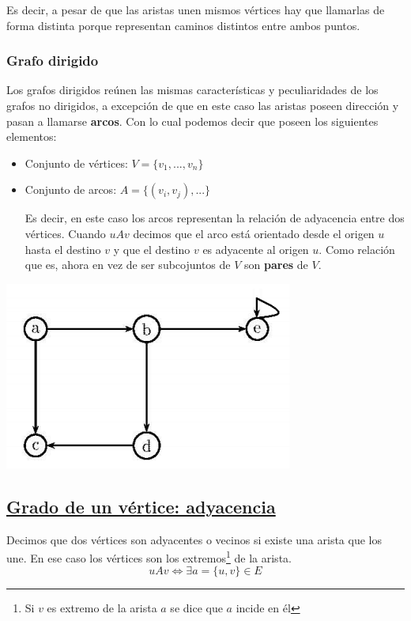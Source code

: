 \documentclass[10pt,a4paper,openright]{book}
\begin{document}
Es decir, a pesar de que las aristas unen mismos vértices hay que llamarlas de forma distinta porque representan caminos distintos entre ambos puntos.

\subsubsection*{Grafo dirigido}
Los grafos dirigidos reúnen las mismas características y peculiaridades de los grafos no dirigidos, a excepción de que en este caso las aristas poseen dirección y pasan a llamarse \textbf{arcos}. Con lo cual podemos decir que poseen los siguientes elementos:
\begin{itemize}
\item Conjunto de vértices: $V=\{v_1, ..., v_n\}$

\item Conjunto de arcos: $A=\{(v_i,v_j), ...\}$

	Es decir, en este caso los arcos representan la relación de adyacencia entre dos vértices. Cuando $uAv$ decimos que el arco está orientado desde el origen $u$ hasta el destino $v$ y que el destino $v$ es adyacente al origen $u$. Como relación que es, ahora en vez de ser subcojuntos de $V$ son \textbf{pares} de $V$.
\end{itemize}

\begin{center}
\includegraphics[scale=0.65]{grafo dirigido}
\end{center}

\subsection*{\underline{Grado de un vértice: adyacencia}}
Decimos que dos vértices son adyacentes o vecinos si existe una arista que los une. En ese caso los vértices son los extremos\footnote{Si $v$ es extremo de la arista $a$ se dice que $a$ incide en él} de la arista.
$$uAv\Leftrightarrow\exists a=\{u,v\}\in E$$
\end{document}
